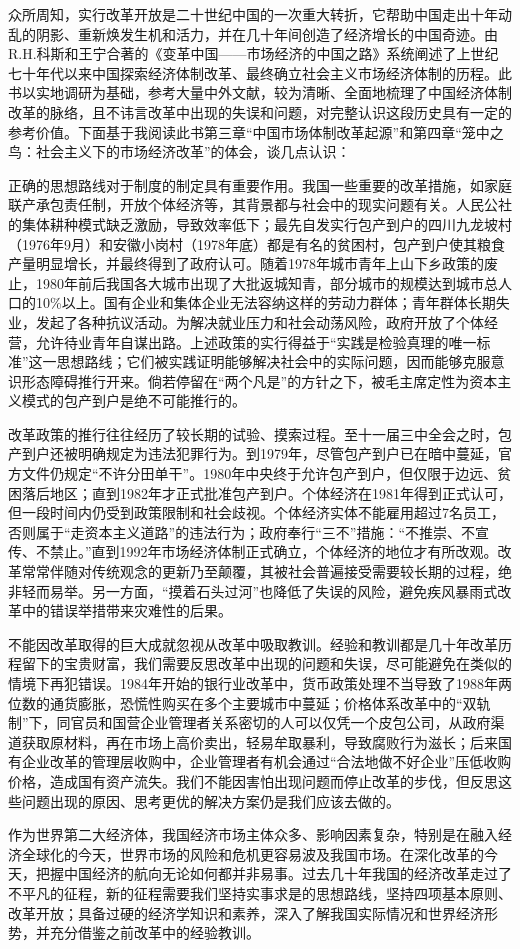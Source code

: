 \par 众所周知，实行改革开放是二十世纪中国的一次重大转折，它帮助中国走出十年动乱的阴影、重新焕发生机和活力，并在几十年间创造了经济增长的中国奇迹。由R.H.科斯和王宁合著的《变革中国——市场经济的中国之路》系统阐述了上世纪七十年代以来中国探索经济体制改革、最终确立社会主义市场经济体制的历程。此书以实地调研为基础，参考大量中外文献，较为清晰、全面地梳理了中国经济体制改革的脉络，且不讳言改革中出现的失误和问题，对完整认识这段历史具有一定的参考价值。下面基于我阅读此书第三章“中国市场体制改革起源”和第四章“笼中之鸟：社会主义下的市场经济改革”的体会，谈几点认识：
\par 正确的思想路线对于制度的制定具有重要作用。我国一些重要的改革措施，如家庭联产承包责任制，开放个体经济等，其背景都与社会中的现实问题有关。人民公社的集体耕种模式缺乏激励，导致效率低下；最先自发实行包产到户的四川九龙坡村（1976年9月）和安徽小岗村（1978年底）都是有名的贫困村，包产到户使其粮食产量明显增长，并最终得到了政府认可。随着1978年城市青年上山下乡政策的废止，1980年前后我国各大城市出现了大批返城知青，部分城市的规模达到城市总人口的10\%以上。国有企业和集体企业无法容纳这样的劳动力群体；青年群体长期失业，发起了各种抗议活动。为解决就业压力和社会动荡风险，政府开放了个体经营，允许待业青年自谋出路。上述政策的实行得益于“实践是检验真理的唯一标准”这一思想路线；它们被实践证明能够解决社会中的实际问题，因而能够克服意识形态障碍推行开来。倘若停留在“两个凡是”的方针之下，被毛主席定性为资本主义模式的包产到户是绝不可能推行的。
\par 改革政策的推行往往经历了较长期的试验、摸索过程。至十一届三中全会之时，包产到户还被明确规定为违法犯罪行为。到1979年，尽管包产到户已在暗中蔓延，官方文件仍规定“不许分田单干”。1980年中央终于允许包产到户，但仅限于边远、贫困落后地区；直到1982年才正式批准包产到户。个体经济在1981年得到正式认可，但一段时间内仍受到政策限制和社会歧视。个体经济实体不能雇用超过7名员工，否则属于“走资本主义道路”的违法行为；政府奉行“三不”措施：“不推崇、不宣传、不禁止。”直到1992年市场经济体制正式确立，个体经济的地位才有所改观。改革常常伴随对传统观念的更新乃至颠覆，其被社会普遍接受需要较长期的过程，绝非轻而易举。另一方面，“摸着石头过河”也降低了失误的风险，避免疾风暴雨式改革中的错误举措带来灾难性的后果。
\par 不能因改革取得的巨大成就忽视从改革中吸取教训。经验和教训都是几十年改革历程留下的宝贵财富，我们需要反思改革中出现的问题和失误，尽可能避免在类似的情境下再犯错误。1984年开始的银行业改革中，货币政策处理不当导致了1988年两位数的通货膨胀，恐慌性购买在多个主要城市中蔓延；价格体系改革中的“双轨制”下，同官员和国营企业管理者关系密切的人可以仅凭一个皮包公司，从政府渠道获取原材料，再在市场上高价卖出，轻易牟取暴利，导致腐败行为滋长；后来国有企业改革的管理层收购中，企业管理者有机会通过“合法地做不好企业”压低收购价格，造成国有资产流失。我们不能因害怕出现问题而停止改革的步伐，但反思这些问题出现的原因、思考更优的解决方案仍是我们应该去做的。
\par 作为世界第二大经济体，我国经济市场主体众多、影响因素复杂，特别是在融入经济全球化的今天，世界市场的风险和危机更容易波及我国市场。在深化改革的今天，把握中国经济的航向无论如何都并非易事。过去几十年我国的经济改革走过了不平凡的征程，新的征程需要我们坚持实事求是的思想路线，坚持四项基本原则、改革开放；具备过硬的经济学知识和素养，深入了解我国实际情况和世界经济形势，并充分借鉴之前改革中的经验教训。

